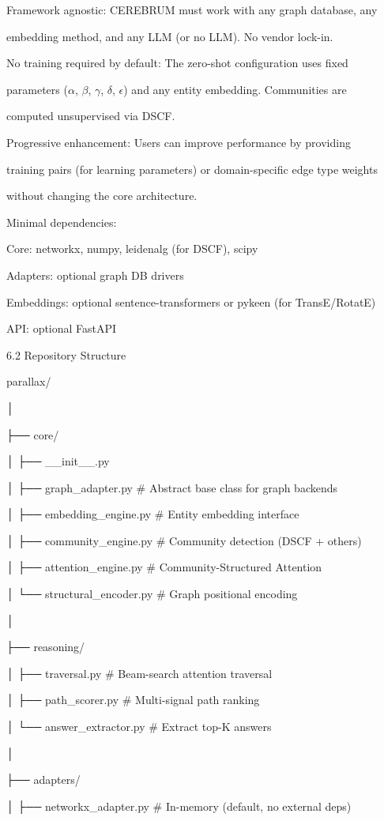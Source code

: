 \documentclass[10pt,journal,compsoc]{IEEEtran}
\begin{document}
Framework agnostic: CEREBRUM must work with any graph database, any

embedding method, and any LLM (or no LLM). No vendor lock-in.

No training required by default: The zero-shot confi\-guration uses fixed

parameters ($\alpha$, $\beta$, $\gamma$, $\delta$, $\epsilon$) and any entity embedding. Communities are

computed unsup\-ervised via DSCF.

Progressive enhancement: Users can improve performance by providing

training pairs (for learning parameters) or domain-specific edge type weights

without changing the core archi\-tecture.

Minimal depen\-dencies:

Core: networkx, numpy, leidenalg (for DSCF), scipy

Adapters: optional graph DB drivers

Embeddings: optional sentence-trans\-formers or pykeen (for TransE/RotatE)

API: optional FastAPI

6.2 Repository Structure

parallax/

│

├── core/

│   ├── \_\_init\_\_.py

│   ├── graph\_adapter.py        \# Abstract base class for graph backends

│   ├── embedding\_engine.py     \# Entity embedding interface

│   ├── community\_engine.py     \# Community detection (DSCF + others)

│   ├── attention\_engine.py     \# Community-Structured Attention

│   └── structural\_encoder.py   \# Graph positional encoding

│

├── reasoning/

│   ├── traversal.py            \# Beam-search attention traversal

│   ├── path\_scorer.py          \# Multi-signal path ranking

│   └── answer\_extractor.py     \# Extract top-K answers

│

├── adapters/

│   ├── networkx\_adapter.py     \# In-memory (default, no external deps)
\end{document}
